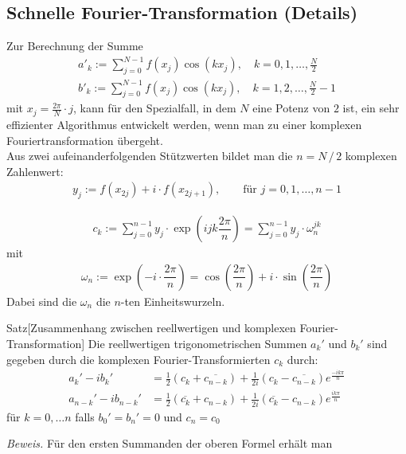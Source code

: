 \subsection{Schnelle Fourier-Transformation (Details)}
Zur Berechnung der Summe
\begin{align*}
  a'_k := \sum_{j=0}^{N-1} f(x_j)\cos(kx_j), \quad k=0,1,\dots,\tfrac{N}{2} \\
  b'_k := \sum_{j=0}^{N-1} f(x_j)\cos(kx_j), \quad k=1,2,\dots,\tfrac{N}{2}-1 
\end{align*}
mit $x_j=\tfrac{2\pi}{N}\cdot j$, kann für den Spezialfall, in dem $N$ eine Potenz von $2$ ist, ein sehr effizienter 
Algorithmus entwickelt werden, wenn man zu einer komplexen Fouriertransformation übergeht. \\
Aus zwei aufeinanderfolgenden Stützwerten bildet man die $n=N\,/\,2$ komplexen Zahlenwert:
\begin{align*}y_j := f(x_{2j}) + i\cdot f(x_{2j+1}),\qquad \text{für } j=0,1,\dots,n-1\end{align*}
\begin{defbox}
  \begin{align*}
    c_k := \sum_{j=0}^{n-1} y_j\cdot \exp\left(ijk\dfrac{2\pi}{n}\right) = \sum_{j=0}^{n-1} y_j\cdot \omega_n^{jk}
  \end{align*}
  mit 
  \begin{align*}\omega_n := \exp\left(-i\cdot\dfrac{2\pi}{n}\right) = \cos\left(\dfrac{2\pi}{n}\right)+i\cdot\sin\left(\dfrac{2\pi}{n}\right)\end{align*}
  Dabei sind die $\omega_n$ die $n$-ten Einheitswurzeln.
\end{defbox}
\newpage
\begin{colbox}{Satz}[Zusammenhang zwischen reellwertigen und komplexen Fourier-Transformation]
  Die reellwertigen trigonometrischen Summen $a_k'$ und $b_k'$ sind gegeben durch die komplexen 
  Fourier-Transformierten $c_k$ durch:
  \begin{align*}
  a_k'-ib_k'&=\tfrac{1}{2}(c_k+\overline{c_{n-k}}) + \tfrac{1}{2i}(c_k-\overline{c_{n-k}})e^{\tfrac{-ik\pi}{n}} \\
  a_{n-k}'-ib_{n-k}'&=\tfrac{1}{2}(\overline{c_k}+c_{n-k}) + \tfrac{1}{2i}(\overline{c_k}-c_{n-k})e^{\tfrac{ik\pi}{n}}
  \end{align*}
  für $k=0,\dots n$ falls $b_0'=b_n'=0$ und $c_n=c_0$
\end{colbox}
\textit{Beweis.} 
Für den ersten Summanden der oberen Formel erhält man 
